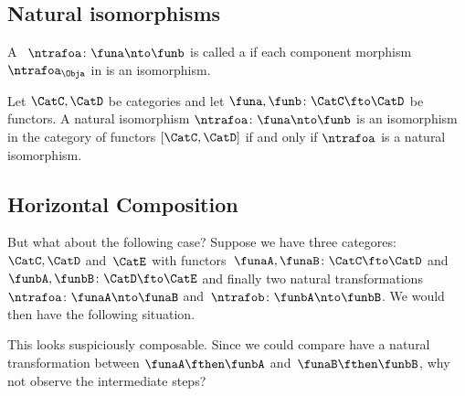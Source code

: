 \subsection{Natural isomorphisms}

\begin{ctdefinition}
    \label{def:natural-isomorphism}
    A ~$\ntrafoa \colon \funa \nto \funb $ is called a  if each component morphism ~$\ntrafoa_\Obja$ in \CatD is an isomorphism.
\end{ctdefinition}

\begin{lemma}
    Let $\CatC, \CatD$ be categories and let $\funa, \funb \colon \CatC \fto \CatD$ be functors.
    A natural isomorphism $\ntrafoa \colon \funa \nto \funb $ is an isomorphism in the category of functors $[\CatC, \CatD]$ if and only if $\ntrafoa$ is a natural isomorphism.
\end{lemma}

\subsection{Horizontal Composition}

But what about the following case? Suppose we have three categores:~$\CatC, \CatD$ and~$\CatE$ with functors~$\funaA,\funaB\colon\CatC \fto \CatD$ and~$\funbA,\funbB\colon \CatD \fto \CatE$ and finally two natural transformations
$\ntrafoa\colon \funaA \nto \funaB$ and~$\ntrafob\colon \funbA \nto \funbB$.
We would then have the following situation.


This looks suspiciously composable.
Since we could compare have a natural transformation between $\funaA \fthen \funbA$ and~$\funaB\fthen \funbB$,
why not observe the intermediate steps?

